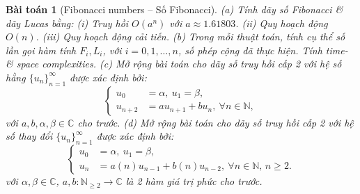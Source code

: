 \documentclass{article}
\newtheorem{baitoan}{Bài toán}
\begin{document}
\begin{baitoan}[Fibonacci numbers -- Số Fibonacci]
	(a) Tính dãy số Fibonacci \& dãy Lucas bằng: (i) Truy hồi $O(a^n)$ với $a\approx1.61803$. (ii) Quy hoạch động $O(n)$. (iii) Quy hoạch động cải tiến. (b) Trong mỗi thuật toán, tính cụ thể số lần gọi hàm tính $F_i,L_i$, với $i = 0,1,\ldots,n$, số phép cộng đã thực hiện. Tính time- \& space complexities. (c) Mở rộng bài toán cho dãy số truy hồi cấp 2 với hệ số hằng $\{u_n\}_{n=1}^\infty$ được xác định bởi:
	\begin{equation*}
		\left\{\begin{split}
			u_0 &= \alpha,\ u_1 = \beta,\\
			u_{n+2} &= au_{n+1} + bu_n,\ \forall n\in\mathbb{N},
		\end{split}\right.
	\end{equation*}
	với $a,b,\alpha,\beta\in\mathbb{C}$ cho trước. (d) Mở rộng bài toán cho dãy số truy hồi cấp 2 với hệ số thay đổi $\{u_n\}_{n=1}^\infty$ được xác định bởi:
	\begin{equation*}
		\left\{\begin{split}
			u_0 &= \alpha,\ u_1 = \beta,\\
			u_n &= a(n)u_{n-1} + b(n)u_{n-2},\ \forall n\in\mathbb{N},\,n\ge2.
		\end{split}\right.
	\end{equation*}
	với $\alpha,\beta\in\mathbb{C}$, $a,b:\mathbb{N}_{\ge2}\to\mathbb{C}$ là 2 hàm giá trị phức cho trước.
\end{baitoan}
\end{document}
